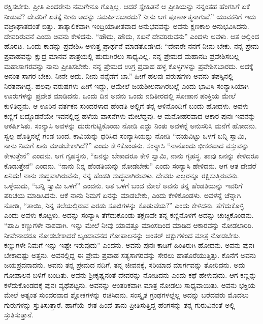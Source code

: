 ರಕ್ಷಿಸಬೇಕು. ಪ್ರೀತಿ ಎಂದರೇನು ನಮಗೇನೂ ಗೊತ್ತಿಲ್ಲ. ಆದರೆ ಸ್ನೇಹಿತನೆ ಆ ಪ್ರೀತಿಯನ್ನು ನನ್ನಂತಹ ಹೆಂಗಸಿಗೆ ಏಕೆ ನೀಡುವೆ? ದೇವರಿಗೆ ಏತಕ್ಕೆ ನೀನು ಅದನ್ನು ಸಮರ್ಪಿಸಬಾರದು? ನೀನು ಆಗ ಪೂರ್ಣಾತ್ಮನಾಗುವೆ.” ಯುವಕನಿಗೆ ಇದು ವಜ್ರಾಘಾತದಂತೆ ಬಿತ್ತು. ತಾತ್ಕಾಲಿಕವಾಗಿ ಇಂದ್ರಿಯಾತೀತವಾದ ಅನುಭವವನ್ನು ಅವನು ಕ್ಷಣಕಾಲ ಅನುಭವಿಸಿದನು. ದೇವರಿರುವನೆ ಎಂದು ಅವನು ಕೇಳಿದನು. “ಹೌದು, ಹೌದು, ಸಖನೆ ದೇವರಿರುವನು” ಎಂದಳು ಅವಳು. ಆತ ಅಲ್ಲಿಂದ ಹೊರಟ. ಒಂದು ಕಾಡನ್ನು ಪ್ರವೇಶಿಸಿ ಅಳುತ್ತ ಪ್ರಾರ್ಥನೆ ಮಾಡತೊಡಗಿದ: “ದೇವರೇ ನನಗೆ ನೀನು ಬೇಕು. ನನ್ನ ಪ್ರೇಮ ಪ್ರವಾಹವನ್ನು ಕ್ಷುದ್ರ ಮಾನವ ಪಾತ್ರೆಯಲ್ಲಿ ಹುದುಗಿರಲು ಸಾಧ್ಯವಿಲ್ಲ. ನನ್ನ ಪ್ರೇಮದ ಮಹಾನದಿ ಪ್ರವೇಶಿಸ\-ಬಲ್ಲ ಮಹಾಸಾಗರವನ್ನು ನಾನು ಪ್ರೀತಿಸಬೇಕು. ನನ್ನ ಪ್ರೇಮದ ಉಗ್ರ ಪ್ರವಾಹ ಹಳ್ಳ ಕೊಳ್ಳಗಳನ್ನು ಪ್ರವೇಶಿಸಬಾರದು. ಅದಕ್ಕೆ ಅನಂತ ಸಾಗರ ಬೇಕು. ನೀನೇ ಅದು. ನೀನು ನನ್ನೆಡೆಗೆ ಬಾ.” ಹೀಗೆ ಹಲವು ವರುಷಗಳು ಅವನು ತಪಸ್ಸಿನಲ್ಲಿ ನಿರತ\-ನಾಗಿದ್ದ. ಹಲವು ವರುಷಗಳು ಹೀಗೆ ಇದ್ದು, ಆಮೇಲೆ ಜಯಶೀಲನಾಗಿರಬಲ್ಲೆ ಎಂದು ಭಾವಿಸಿ ಸಂನ್ಯಾಸಿಯಾಗಿ ಊರುಗಳನ್ನು ಪ್ರವೇಶ ಮಾಡಿದನು. ಒಂದು ದಿನ ಅವನು ಒಂದು ನದಿತೀರದಲ್ಲಿ ಸೋಪಾನ ಪಂಕ್ತಿಯ ಮೇಲೆ ಕುಳಿತಿದ್ದನು. ಆ ಊರಿನ ವರ್ತಕನ ಸುಂದರಳಾದ ಹೆಂಡತಿ ಅಲ್ಲಿಗೆ ತನ್ನ ಆಳಿನೊಂದಿಗೆ ಬಂದು ಹೋದಳು. ಅವಳು ಕಣ್ಣಿಗೆ ಬಿದ್ದೊಡನೆಯೇ ಇವ\-ನಲ್ಲಿದ್ದ ಹಳೆಯ ವಾಸನೆಗಳು ಮೇಲೆದ್ದವು. ಆ ಮನೋಹರವಾದ ಆಕಾರ ಪುನಃ ಇವನನ್ನು ಆಕರ್ಷಿಸಿತು. ಸಂನ್ಯಾಸಿ ಅವಳನ್ನು ದುರುಗುಟ್ಟಿಕೊಂಡು ನೋಡಿ ಎದ್ದು ನಿಂತು ಅವಳನ್ನೆ ಅನುಸರಿಸಿ ಮನೆಗೆ ಹೋದನು. ಸ್ವಲ್ಪ ಹೊತ್ತಿನಲ್ಲೆ ಗಂಡ ಬಂದ. ಕಾವಿಯನ್ನು ಧರಿಸಿದ ಸಂನ್ಯಾಸಿಯನ್ನು ನೋಡಿ “ದಯವಿಟ್ಟು ಒಳಗೆ ಬನ್ನಿ ಸ್ವಾಮಿ, ನಾನು ನಿಮಗೆ ಏನು ಮಾಡಬೇಕಾಗಿದೆ?” ಎಂದು ಕೇಳಿಕೊಂಡನು. ಸಂನ್ಯಾಸಿ “ನಾನೊಂದು ಭೀಕರವಾದ ವಸ್ತುವನ್ನು ಕೇಳುತ್ತೇನೆ” ಎಂದನು. ಆಗ ಗೃಹಸ್ಥನು, “ಏನನ್ನು ಬೇಕಾದರೂ ಕೇಳಿ ಸ್ವಾಮಿ, ನಾನು ಗೃಹಸ್ಥ. ತಾವು ಏನನ್ನು ಕೇಳಿದರೂ ಕೊಡುತ್ತೇನೆ” ಎಂದನು. “ನಾನು ನಿನ್ನ ಹೆಂಡತಿಯನ್ನು ನೋಡಬೇಕು” ಎಂದು ಸಂನ್ಯಾಸಿ ಹೇಳಿದನು. ಆಗ ಆತ ದೇವರೆ ಏನಿದು! ನಾನು ಶುದ್ಧವಾಗಿರುವೆನು, ನನ್ನ ಹೆಂಡತಿ ಶುದ್ಧವಾಗಿರುವಳು. ದೇವರು ಎಲ್ಲರನ್ನೂ ರಕ್ಷಿಸುತ್ತಿರುವನು. ಒಳ್ಳೆಯದು, “ಬನ್ನಿ ಸ್ವಾಮಿ ಒಳಗೆ” ಎಂದನು. ಆತ ಒಳಗೆ ಬಂದ ಮೇಲೆ ಅವನು ತನ್ನ ಹೆಂಡತಿಯನ್ನು ಇವರಿಗೆ ಪರಿಚಯ ಮಾಡಿಸಿದನು. ಆಕೆ ನಾನು ನಿಮಗೆ ಏನನ್ನು ಮಾಡಬೇಕು, ಎಂದು ಕೇಳಿಕೊಂಡಳು. ಅವಳನ್ನೆ ಚೆನ್ನಾಗಿ ನೋಡಿ, “ತಾಯಿ, ನಿನ್ನ ತಲೆಯಲ್ಲಿರುವ ಎರಡು ಸೂಜಿಗಳನ್ನು ಕೊಡುವೆಯ?” ಎಂದು ಕೇಳಿದನು. ತೆಗೆದುಕೊಳ್ಳಿ ಎಂದು ಅವಳು ಕೊಟ್ಟಳು. ಅದನ್ನು ಸಂನ್ಯಾಸಿ ತೆಗೆದುಕೊಂಡು ತಕ್ಷಣವೇ ತನ್ನ ಕಣ್ಣಿನೊಳಗೆ ಅದನ್ನು ಚುಚ್ಚಿಕೊಂಡನು. “ಪಾಪಿ ಕಣ್ಣುಗಳೇ ನಾಶವಾಗಿ. ಇನ್ನು ಮೇಲೆ ನೀವು ಯಾವತ್ತೂ ಮಾಂಸದಿಂದ ಮಾಡಿದ ಆಕಾರವನ್ನು ನೋಡಲಾರಿರಿ. ನೀವೇನಾದರೂ ನೋಡಬೇಕಾದರೆ ಬೃಂದಾವನದ ಗೋಪಾಲನನ್ನು ಅಂತರ್​ ಚಕ್ಷುಗಳಿಂದ ಮಾತ್ರ ನೋಡಬೇಕು. ಕಣ್ಣುಗಳೇ ನಿಮಗೆ ಇನ್ನು ಇಷ್ಟೇ ಇರುವುದು” ಎಂದನು. ಅವನು ಪುನಃ ಕಾಡಿಗೆ ಹಿಂತಿರುಗಿ ಹೋದನು. ಅವನು ಪುನಃ ಬೇಕಾದಷ್ಟು ಅತ್ತನು. ಅವನಲ್ಲಿದ್ದ ಈ ಪ್ರೇಮ ಪ್ರವಾಹ ಸತ್ಯಸಾಗರವನ್ನು ಸೇರಲು ಹಾತೊರೆಯುತ್ತಿತ್ತು. ಕೊನೆಗೆ ಅವನು ಜಯಪ್ರದನಾದನು. ಅವನು ತನ್ನ ಪ್ರೇಮದ ನದಿಗೆ, ತನ್ನ ಜೀವನಕ್ಕೆ, ಸರಿಯಾದ ಮಾರ್ಗವನ್ನು ತೋರಿದನು. ಅದು ಗೋಪಾಲನ ಬಳಿಗೆ ಬಂದಿತು. ಅವನು ಶ‍್ರೀಕೃಷ್ಣನಂತೆ ದೇವರನ್ನು ನೋಡಿದನು ಎಂದು ಕಥೆ ಹೇಳುವುದು. ಆಗ ಕಣ್ಣನ್ನು ಕಳೆದುಕೊಂಡದಕ್ಕೆ ಪುನಃ ವ್ಯಥೆಪಟ್ಟನು. ಅವನನ್ನು ಆಂತರಿಕವಾಗಿ ಮಾತ್ರ ನೋಡಲು ಸಾಧ್ಯವಾಯಿತು. ಅವನು ಭಕ್ತಿಯ ಮೇಲೆ ಅತ್ಯಂತ ಸುಂದರವಾದ ಶ್ಲೋಕಗಳನ್ನು ರಚಿಸಿದನು. ಸಂಸ್ಕೃತ ಗ್ರಂಥಗಳಲ್ಲೆಲ್ಲ ಅದನ್ನು ಬರೆದವರು ಮೊದಲು ಗುರುಗಳನ್ನು ಸ್ತುತಿಸುತ್ತಾರೆ. ಹಾಗೆಯೆ ಈತ ಹಿಂದೆ ತಾನು ಪ್ರೀತಿಸುತ್ತಿದ್ದ ಹೆಂಗಸನ್ನು ತನ್ನ ಗುರುವಿನಂತೆ ಅಲ್ಲಿ ಸ್ತುತಿಸುತ್ತಾನೆ.


